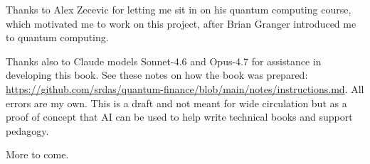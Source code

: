 \documentclass[oneside,11pt]{memoir}
\begin{document}
Thanks to Alex Zecevic for letting me sit in on his quantum computing course, which motivated me to work on this project, after Brian Granger introduced me to quantum computing. 

Thanks also to Claude models Sonnet-4.6 and Opus-4.7 for assistance in developing this book. See these notes on how the book was prepared: \url{https://github.com/srdas/quantum-finance/blob/main/notes/instructions.md}. All errors are my own. This is a draft and not meant for wide circulation but as a proof of concept that AI can be used to help write technical books and support pedagogy. 

More to come. 
































\printindex








\checknbdrafts
\end{document}
